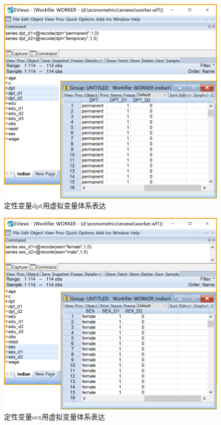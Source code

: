 \documentclass[12pt,(landscape,a4paper),(portrait,a4paper)]{article}
\theoremstyle{definition}
\theoremstyle{definition}
\theoremstyle{definition}
\theoremstyle{remark}
\begin{document}
\begin{figure}

{\centering \includegraphics[width=23.33in]{picture/lab8-dummy-model/1-dummy-dpt} 

}

\caption{定性变量dpt用虚拟变量体系表达}\label{fig:fig-dummy-dpt}
\end{figure}

\begin{figure}

{\centering \includegraphics[width=23.42in]{picture/lab8-dummy-model/1-dummy-sex} 

}

\caption{定性变量sex用虚拟变量体系表达}\label{fig:fig-dummy-sex}
\end{figure}
\end{document}
